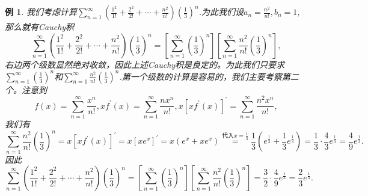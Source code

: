 \documentclass{article}
\newtheorem{example}{例}[subsection]
\begin{document}
\begin{example}
我们考虑计算$\sum_{n=1}^{\infty}{\left( \frac{1^2}{1!}+\frac{2^2}{2!}+\cdots +\frac{n^2}{n!} \right) \left( \frac{1}{3} \right) ^n}$.为此我们设$a_n=\frac{n^2}{n!},b_n=1$,那么就有Cauchy积
$$
\sum_{n=1}^{\infty}{\left( \frac{1^2}{1!}+\frac{2^2}{2!}+\cdots +\frac{n^2}{n!} \right) \left( \frac{1}{3} \right) ^n}=\left[ \sum_{n=1}^{\infty}{\left( \frac{1}{3} \right) ^n} \right] \left[ \sum_{n=1}^{\infty}{\frac{n^2}{n!}\left( \frac{1}{3} \right) ^n} \right] ,
$$
右边两个级数显然绝对收敛，因此上述Cauchy积是良定的。为此我们只要求$\sum_{n=1}^{\infty}{\left( \frac{1}{3} \right) ^n}$和$\sum_{n=1}^{\infty}{\frac{n^2}{n!}\left( \frac{1}{3} \right) ^n}$.第一个级数的计算是容易的，我们主要考察第二个。注意到
$$
f\left( x \right) =\sum_{n=1}^{\infty}{\frac{x^n}{n!}},xf^{\prime}\left( x \right) =\sum_{n=1}^{\infty}{\frac{nx^n}{n!}},x\left[ xf^{\prime}\left( x \right) \right] ^{\prime}=\sum_{n=1}^{\infty}{\frac{n^2x^n}{n!}},
$$
我们有
$$
\sum_{n=1}^{\infty}{\frac{n^2}{n!}\left( \frac{1}{3} \right) ^n}=x\left[ xf^{\prime}\left( x \right) \right] ^{\prime}=x\left[ xe^x \right] ^{\prime}=x\left( e^x+xe^x \right) \overset{\text{代入}x=\frac{1}{3}}{=}\frac{1}{3}\left( e^{\frac{1}{3}}+\frac{1}{3}e^{\frac{1}{3}} \right) =\frac{1}{3}\cdot \frac{4}{3}e^{\frac{1}{3}}=\frac{4}{9}e^{\frac{1}{3}}.
$$
因此
$$
\sum_{n=1}^{\infty}{\left( \frac{1^2}{1!}+\frac{2^2}{2!}+\cdots +\frac{n^2}{n!} \right) \left( \frac{1}{3} \right) ^n}=\left[ \sum_{n=1}^{\infty}{\left( \frac{1}{3} \right) ^n} \right] \left[ \sum_{n=1}^{\infty}{\frac{n^2}{n!}\left( \frac{1}{3} \right) ^n} \right] =\frac{3}{2}\cdot \frac{4}{9}e^{\frac{1}{3}}=\frac{2}{3}e^{\frac{1}{3}}.
$$
\end{example}
\end{document}
